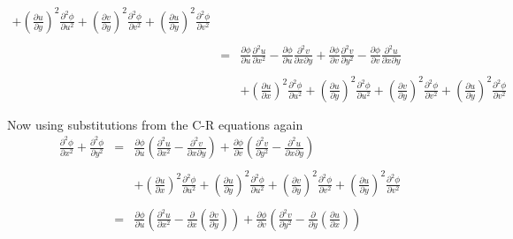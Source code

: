\documentclass[10pt]{amsart}
\theoremstyle{nonumberplain}
\begin{document}
\begin{enumerate}[label={\bf {\arabic*}:}]
\begin{eqnarray*}
												        	 + \left(\frac{\partial u}{\partial y}\right)^2 \frac{\partial^2 \phi}{\partial u^2}
													 + \left(\frac{\partial v}{\partial y}\right)^2 \frac{\partial^2 \phi}{\partial v^2} 
													 + \left(\frac{\partial u}{\partial y}\right)^2\frac{\partial^2 \phi}{\partial v^2} \\ \\
												&=& \frac{\partial\phi}{\partial u} \frac{\partial^2 u}{\partial x^2}
													- \frac{\partial\phi}{\partial u} \frac{\partial^2 v}{\partial x \partial y} 
													+ \frac{\partial\phi}{\partial v} \frac{\partial^2 v}{\partial y^2} 
													- \frac{\partial\phi}{\partial v} \frac{\partial^2 u}{\partial x \partial y}\\ \\
												    && +  \left(\frac{\partial u}{\partial x}\right)^2 \frac{\partial^2 \phi}{\partial u^2}
												        	 + \left(\frac{\partial u}{\partial y}\right)^2 \frac{\partial^2 \phi}{\partial u^2}
													 + \left(\frac{\partial v}{\partial y}\right)^2 \frac{\partial^2 \phi}{\partial v^2} 
													 + \left(\frac{\partial u}{\partial y}\right)^2\frac{\partial^2 \phi}{\partial v^2} \\ \\
\end{eqnarray*}
Now using substitutions from the C-R equations again
\begin{eqnarray*}
\frac{\partial^2\phi}{\partial x^2} + \frac{\partial^2 \phi }{\partial y^2} &=& \frac{\partial\phi}{\partial u} \left(\frac{\partial^2 u}{\partial x^2} - \frac{\partial^2 v}{\partial x \partial y} \right)
													+ \frac{\partial\phi}{\partial v} \left(\frac{\partial^2 v}{\partial y^2} - \frac{\partial^2 u}{\partial x \partial y} \right)\\ \\
												    && +  \left(\frac{\partial u}{\partial x}\right)^2 \frac{\partial^2 \phi}{\partial u^2}
												        	 + \left(\frac{\partial u}{\partial y}\right)^2 \frac{\partial^2 \phi}{\partial u^2}
													 + \left(\frac{\partial v}{\partial y}\right)^2 \frac{\partial^2 \phi}{\partial v^2} 
													 + \left(\frac{\partial u}{\partial y}\right)^2\frac{\partial^2 \phi}{\partial v^2} \\ \\
												&=& \frac{\partial\phi}{\partial u} \left(\frac{\partial^2 u}{\partial x^2} - \frac{\partial}{\partial x} \left(\frac{\partial v}{\partial y} \right)\right)
													+ \frac{\partial\phi}{\partial v} \left(\frac{\partial^2 v}{\partial y^2} - \frac{\partial}{\partial y} \left(\frac{\partial u}{\partial x} \right) \right) \\ \\

\end{eqnarray*}
\end{enumerate}
\end{document}
